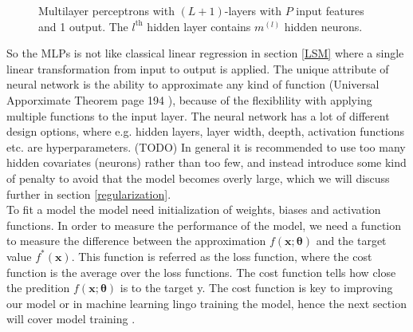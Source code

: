 \begin{figure}[th]
	\caption[Multilayer perceptrons with $(L+1)$-layers]{Multilayer perceptrons with $(L+1)$-layers with $P$ input features and 1 output. The $l^{\text{th}}$ hidden layer contains $m^{(l)}$ hidden neurons.}
	\label{fig:multilayer-perceptron}
\end{figure}

So the MLPs is not like classical linear regression in section \ref{LSM} where a single linear transformation from input to output is applied. The unique attribute of neural network is the ability to approximate any kind of function (Universal Apporximate Theorem page 194 \parencite{Goodfellow-et-al-2016}), because of the flexiblility with applying multiple functions to the input layer. The neural network has a lot of different design options, where e.g. hidden layers, layer width, deepth, activation functions etc. are hyperparameters. (TODO) In general it is recommended to use too many hidden covariates (neurons) rather than too few, and instead introduce some kind of penalty to avoid that the model becomes overly large, which we will discuss further in section \ref{regularization}.\\

To fit a model the model need initialization of weights, biases and activation functions. In order to measure the performance of the model, we need a function to measure the difference between the approximation $f(\bm{x};\bm{\theta})$ and the target value $f^*(\bm{x})$. This function is referred as the loss function, where the cost function is the average over the loss functions. The cost function tells how close the predition $f(\bm{x};\bm{\theta})$ is to the target y. The cost function is key to improving our model or in machine learning lingo training the model, hence the next section will cover model training \parencite{Goodfellow-et-al-2016}.

